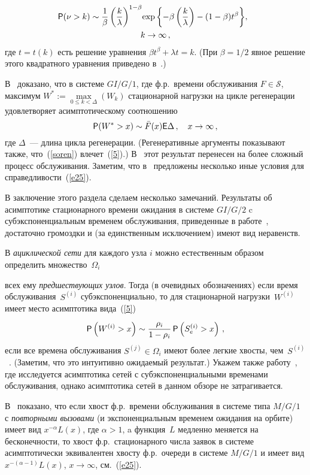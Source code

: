 \begin{multicols}{2}
{\noindent
\begin{multline*}
\!\!\!\!{\sf P}(\nu>k)\sim
\displaystyle\frac{\displaystyle 1\mathstrut}{\displaystyle \beta\mathstrut}\left(\displaystyle\frac{\displaystyle k\mathstrut}{\displaystyle \lambda\mathstrut}\right)^{1-\beta}\!\exp
\left\{-\beta\left(\displaystyle\frac{\displaystyle k\mathstrut}{\displaystyle \lambda\mathstrut}\right)-(1-\beta)t^\beta\right\}\!,\\
k\to \infty\,,
\label{queue}
\end{multline*}
где $t=t(k)$ есть решение уравнения $\beta t^\beta+\lambda t= k$.
 (При $\beta=1/2$ явное решение этого квадратного уравнения приведено
в~\cite {AKS}.)

В~\cite{Asmus98} доказано, что в системе $GI/G/1$, где ф.р.\
времени обслуживания $F\in \mathcal{S}$, максимум
$W^*:=\max\limits_{0\le k<\Delta}(W_k)$
стационарной нагрузки на цик\-ле регенерации удовлетворяет асимптотическому соотношению
\begin{equation}
{\sf P}(W^*>x)\sim \bar F(x) {\sf E} \Delta\,,\quad x\to \infty\,,
\label{soren}
\end{equation}
где $\Delta$~--- длина цикла регенерации. (Регенеративные аргументы
показывают также, что~(\ref{soren}) влечет~(\ref{5}).) В~\cite{SorenJakob}
этот результат перенесен на более сложный процесс обслуживания. Заметим, что в~\cite{Foss Korsh} предложены несколько
иные условия для справедли\-вости~(\ref{e25}).

В заключение этого раздела сделаем несколько замечаний. Результаты
об асимптотике стационарного времени ожидания в системе $GI/G/2$
c субэкспоненциальным временем обслуживания, приведенные в работе~\cite {FK},
достаточно громоздки и (за единственным исключением) имеют вид неравенств.

 В {\it ациклической сети} для каждого узла $i$ можно естественным образом определить множество~$\Omega_i$}
всех ему {\it предшествующих узлов}. Тогда (в очевидных обозначениях) если время обслуживания~$S^{(i)}$
субэкспоненциально, то для стационарной нагрузки~$W^{(i)}$ имеет место асимптотика вида~(\ref{5})
$$
{\sf P}\left(W^{(i)}>x\right)\sim \displaystyle\frac{\displaystyle \rho_i\mathstrut}{\displaystyle 1-\rho_i\mathstrut}\,{\sf P}\left(S_e^{(i)}>x\right)\,,
$$
если все времена обслуживания $S^{(j)}\in \Omega_i$ имеют более
легкие хвосты, чем~$S^{(i)}$~\cite {Sigman98}. (Заметим, что это интуитивно ожидаемый результат.)
 Укажем также работу~\cite{BF}, где исследуется асимптотика сетей с субэкспоненциальными временами обслуживания,
однако асимптотика сетей в данном обзоре не затрагивается.

В~\cite {retrial} показано, что если хвост ф.р.\ времени
обслуживания в системе типа $M/G/1$ с {\it повторными вызовами} (и
экспоненциальным временем ожидания на орбите) имеет вид $x^{-\alpha} L(x)$,
где $\alpha>1$, a функция~$L$ медленно меняется на
бесконечности, то хвост ф.р.\ стационарного числа заявок в системе
асимптотически эквивалентен хвосту ф.р.\ очереди в системе
$M/G/1$ и имеет вид $x^{-(\alpha-1)}L(x)$, $x\to \infty$, см.~(\ref{e25}).


\end{multicols}
